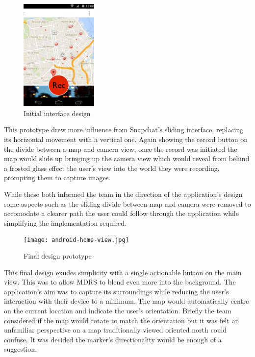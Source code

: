 \documentclass{l3proj}
\begin{document}
\begin{figure}
\begin{center}
  \includegraphics[width=0.34\textwidth]{images/android-digital-prototype-2.jpg}
\end{center}
\caption{Initial interface design}
\end{figure}

This prototype drew more influence from Snapchat’s sliding interface, replacing
its horizontal movement with a vertical one. Again showing the record button on
the divide between a map and camera view, once the record was initiated the map
would slide up bringing up the camera view which would reveal from behind a
frosted glass effect the user's view into the world they were recording,
prompting them to capture images.

While these both informed the team in the direction of the application's design some aspects such as the sliding divide between map and camera were removed to accomodate a clearer path the user could follow through the application while simplifying the implementation required.

\begin{figure}[ht!]
\centering
\texttt{[image: android-home-view.jpg]}
\caption{Final design prototype}
\label{overflow}
\end{figure}

This final design exudes simplicity with a single actionable button on the main view. This was to allow MDRS to blend even more into the background. The application's aim was to capture its surroundings while reducing the user's interaction with their device to a minimum. The map would automatically centre on the current location and indicate the user's orientation. Briefly the team considered if the map would rotate to match the orientation but it was felt an unfamiliar perspective on a map traditionally viewed oriented north could confuse. It was decided the marker's directionality would be enough of a suggestion.
\end{document}
